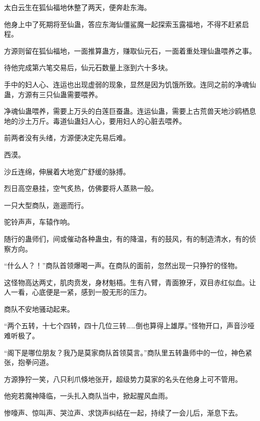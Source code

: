 \begin{this_body}
太白云生在狐仙福地休整了两天，便奔赴东海。

他身上中了死期将至仙蛊，答应东海仙僵鲨魔一起探索玉露福地，不得不赶紧启程。

方源则留在狐仙福地，一面推算蛊方，赚取仙元石，一面着重处理仙蛊喂养之事。

待他完成第六笔交易后，仙元石数量上涨到六十多块。

手中的妇人心、连运也出现虚弱的现象，显然是因为饥饿所致。连同之前的净魂仙蛊，方源有三只仙蛊需要喂养。

净魂仙蛊喂养，需要上万头的白莲巨蚕蛊。连运仙蛊，需要上古荒兽天地沙鸥栖息地的沙土万斤。毒道仙蛊妇人心，要用妇人的心脏去喂养。

前两者没有头绪，方源便决定先易后难。

西漠。

沙丘连绵，伸展着大地宽广舒缓的脉搏。

烈日高空悬挂，空气炙热，仿佛要将人蒸熟一般。

一只大型商队，迤逦而行。

驼铃声声，车辕作响。

随行的蛊师们，间或催动各种蛊虫，有的降温，有的鼓风，有的制造清水，有的侦察方向。

“什么人？！”商队首领爆喝一声。在商队的面前，忽然出现一只狰狞的怪物。

这怪物高达两丈，肌肉贲发，身材魁梧。生有八臂，青面獠牙，双目赤红似血。让人一看，心底便是一紧，感到一股无形的压力。

商队不安地骚动起来。

“两个五转，十七个四转，四十几位三转……倒也算得上雄厚。”怪物开口，声音沙哑难听极了。

“阁下是哪位朋友？我乃是莫家商队首领莫言。”商队里五转蛊师中的一位，神色紧张，抱拳问道。

方源狰狞一笑，八只利爪倏地张开，超级势力莫家的名头在他身上可不管用。

他宛若魔神降临，一头扎入商队当中，掀起腥风血雨。

惨嚎声、惊叫声、哭泣声、求饶声纠结在一起，持续了一会儿后，渐息下去。

\end{this_body}

